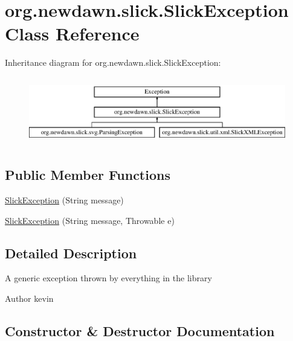\hypertarget{classorg_1_1newdawn_1_1slick_1_1_slick_exception}{}\section{org.\+newdawn.\+slick.\+Slick\+Exception Class Reference}
\label{classorg_1_1newdawn_1_1slick_1_1_slick_exception}
Inheritance diagram for org.\+newdawn.\+slick.\+Slick\+Exception\+:\begin{figure}[H]
\begin{center}
\leavevmode
\includegraphics[height=3.000000cm]{classorg_1_1newdawn_1_1slick_1_1_slick_exception}
\end{center}
\end{figure}
\subsection*{Public Member Functions}
\begin{DoxyCompactItemize}
\item 
\mbox{\hyperlink{classorg_1_1newdawn_1_1slick_1_1_slick_exception_acbbdab9049fd2f6efc4e25c3ac3af5fa}{Slick\+Exception}} (String message)
\item 
\mbox{\hyperlink{classorg_1_1newdawn_1_1slick_1_1_slick_exception_a4e4874e61391121a888a6770b4779c7e}{Slick\+Exception}} (String message, Throwable e)
\end{DoxyCompactItemize}


\subsection{Detailed Description}
A generic exception thrown by everything in the library

\begin{DoxyAuthor}{Author}
kevin 
\end{DoxyAuthor}


\subsection{Constructor \& Destructor Documentation}
\mbox{\label{classorg_1_1newdawn_1_1slick_1_1_slick_exception_acbbdab9049fd2f6efc4e25c3ac3af5fa}} 
